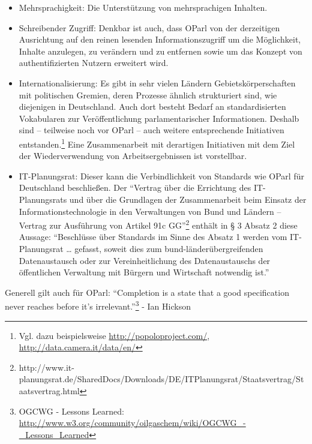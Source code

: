 \documentclass[,a4paper]{article}
\begin{document}
\begin{itemize}
  Standards verwenden. Deshalb werden entsprechende
  Standardisierungsvorhaben wie Linked Data Platform Paging\footnote{https://dvcs.w3.org/hg/ldpwg/raw-file/default/ldp-paging.html}
  des W3C und das Hydra Core Vocabulary\footnote{http://hydra-cg.com/spec/latest/core/\#collections}
  beobachtet.
\item
  Mehrsprachigkeit: Die Unterstützung von mehrsprachigen Inhalten.
\item
  Schreibender Zugriff: Denkbar ist auch, dass OParl von der derzeitigen
  Ausrichtung auf den reinen lesenden Informationszugriff um die
  Möglichkeit, Inhalte anzulegen, zu verändern und zu entfernen sowie um
  das Konzept von authentifizierten Nutzern erweitert wird.
\item
  Internationalisierung: Es gibt in sehr vielen Ländern
  Gebietskörperschaften mit politischen Gremien, deren Prozesse ähnlich
  strukturiert sind, wie diejenigen in Deutschland. Auch dort besteht
  Bedarf an standardisierten Vokabularen zur Veröffentlichung
  parlamentarischer Informationen. Deshalb sind -- teilweise noch vor
  OParl -- auch weitere entsprechende Initiativen entstanden.\footnote{Vgl.
    dazu beispielsweise \url{http://popoloproject.com/},
    \url{http://data.camera.it/data/en/}} Eine Zusammenarbeit mit
  derartigen Initiativen mit dem Ziel der Wiederverwendung von
  Arbeitsergebnissen ist vorstellbar.
\item
  IT-Planungsrat: Dieser kann die Verbindlichkeit von Standards wie
  OParl für Deutschland beschließen. Der ``Vertrag über die Errichtung
  des IT-Planungsrats und über die Grundlagen der Zusammenarbeit beim
  Einsatz der Informationstechnologie in den Verwaltungen von Bund und
  Ländern -- Vertrag zur Ausführung von Artikel 91c GG''\footnote{http://www.it-planungsrat.de/SharedDocs/Downloads/DE/ITPlanungsrat/Staatsvertrag/Staatsvertrag.html}
  enthält in § 3 Absatz 2 diese Aussage: ``Beschlüsse über Standards im
  Sinne des Absatz 1 werden vom IT-Planungsrat \ldots{} gefasst, soweit
  dies zum bund-länderübergreifenden Datenaustausch oder zur
  Vereinheitlichung des Datenaustauschs der öffentlichen Verwaltung mit
  Bürgern und Wirtschaft notwendig ist.''
\end{itemize}

Generell gilt auch für OParl: ``Completion is a state that a good
specification never reaches before it's irrelevant.''\footnote{OGCWG -
  Lessons Learned:
  \url{http://www.w3.org/community/oilgaschem/wiki/OGCWG_-_Lessons_Learned}}
- Ian Hickson
\end{document}
